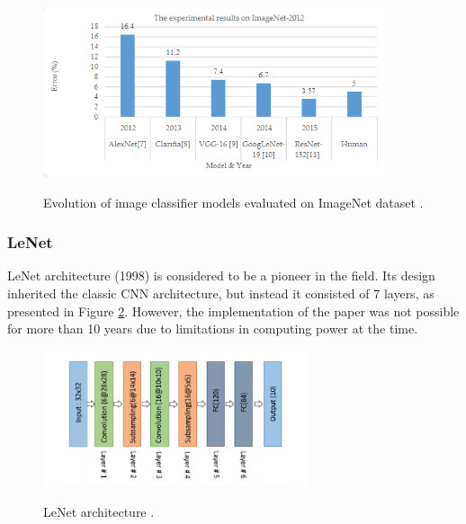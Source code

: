 \begin{figure}[htb]
	\begin{center}
		\includegraphics[height=5cm]{./image_net.png}
	\end{center}
	\caption{Evolution of image classifier models evaluated on ImageNet dataset \cite{alom01}.}
	\begin{center}
		\label{image_net}
	\end{center}
\end{figure}
\FloatBarrier

\subsubsection{LeNet}
LeNet architecture (1998) \cite{lecun-gradientbased-learning-applied-1998} is considered to be a pioneer in the field. Its design inherited the classic CNN architecture, but instead it consisted of 7 layers, as presented in Figure \ref{LeNet}. However, the implementation of the paper was not possible for more than 10 years due to limitations in computing power at the time. 

\begin{figure}[htb]
	\begin{center}
		\includegraphics[height=4cm]{./LeNet.png}
	\end{center}
	\caption{LeNet architecture \cite{alom01}.}
	\begin{center}
		\label{LeNet}
	\end{center}
\end{figure}
\FloatBarrier

